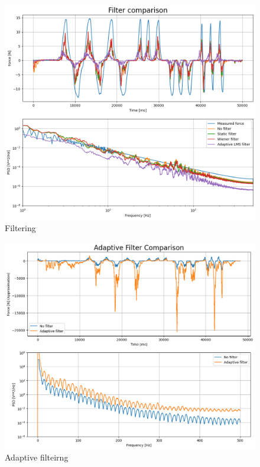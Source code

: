 \begin{figure}[h!t]
	\begin{center}
		\includegraphics[width=1.0\columnwidth]{images/measurement_filtering.png}
	\end{center}
	\caption{Filtering}
	\label{fig:result_filtering}
\end{figure}
\begin{figure}[h!t]
	\begin{center}
		\includegraphics[width=1.0\columnwidth]{images/measurement_adaptive_filtering.png}
	\end{center}
	\caption{Adaptive filteirng}
	\label{fig:result_adaptive_filtering}
\end{figure}

